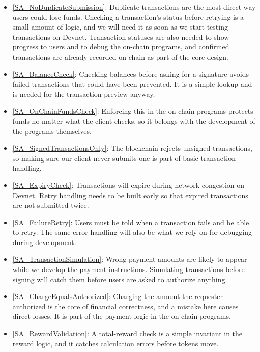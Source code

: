 \documentclass{article}
\newcommand{\saref}[1]{\ref{#1}}
\begin{document}
\begin{itemize}

\item \saref{SA_NoDuplicateSubmission}: Duplicate transactions are the most direct way users could lose funds. Checking a transaction's status before retrying is a small amount of logic, and we will need it as soon as we start testing transactions on Devnet. Transaction statuses are also needed to show progress to users and to debug the on-chain programs, and confirmed transactions are already recorded on-chain as part of the core design.

\item \saref{SA_BalanceCheck}: Checking balances before asking for a signature avoids failed transactions that could have been prevented. It is a simple lookup and is needed for the transaction preview anyway.

\item \saref{SA_OnChainFundsCheck}: Enforcing this in the on-chain programs protects funds no matter what the client checks, so it belongs with the development of the programs themselves.

\item \saref{SA_SignedTransactionsOnly}: The blockchain rejects unsigned transactions, so making sure our client never submits one is part of basic transaction handling.

\item \saref{SA_ExpiryCheck}: Transactions will expire during network congestion on Devnet. Retry handling needs to be built early so that expired transactions are not submitted twice.

\item \saref{SA_FailureRetry}: Users must be told when a transaction fails and be able to retry. The same error handling will also be what we rely on for debugging during development.

\item \saref{SA_TransactionSimulation}: Wrong payment amounts are likely to appear while we develop the payment instructions. Simulating transactions before signing will catch them before users are asked to authorize anything.

\item \saref{SA_ChargeEqualsAuthorized}: Charging the amount the requester authorized is the core of financial correctness, and a mistake here causes direct losses. It is part of the payment logic in the on-chain programs.

\item \saref{SA_RewardValidation}: A total-reward check is a simple invariant in the reward logic, and it catches calculation errors before tokens move.


\end{itemize}
\end{document}
